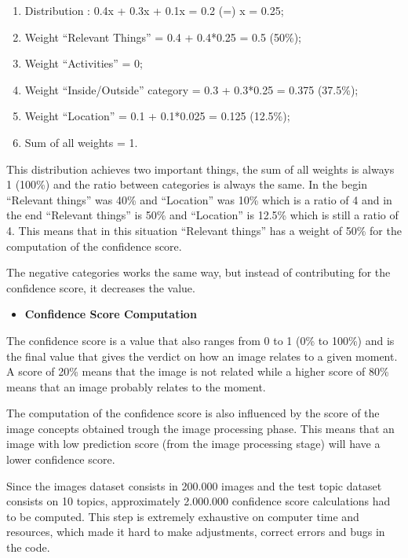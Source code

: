    \begin{enumerate}
    \item Distribution : 0.4x + 0.3x + 0.1x = 0.2 (=) x = 0.25;
    \item Weight \enquote{Relevant Things} = 0.4 + 0.4*0.25 = 0.5 (50\%);
    \item Weight \enquote{Activities} = 0;
    \item Weight \enquote{Inside/Outside} category = 0.3 + 0.3*0.25 = 0.375 (37.5\%);
    \item Weight \enquote{Location} =  0.1 + 0.1*0.025 = 0.125 (12.5\%);
    \item Sum of all weights = 1.
   \end{enumerate}


   This distribution achieves two important things, the sum of all weights is always 1 (100\%) and the ratio between categories is always the same. In the begin \enquote{Relevant things} was 40\% and \enquote{Location} was 10\%  which is a ratio of 4 and in the end \enquote{Relevant things} is 50\% and \enquote{Location} is 12.5\% which is still a ratio of 4. This means that in this situation \enquote{Relevant things} has a weight of 50\% for the computation of the confidence score.
   
   The negative categories works the same way, but instead of contributing for the confidence score, it decreases the value.

    

    \begin{itemize}
      \item \textbf{Confidence Score Computation}
    \end{itemize}

    The confidence score is a value that also ranges from 0 to 1 (0\% to 100\%) and is the final value that gives the verdict on how an image relates to a given moment. A score of 20\% means that the image is not related while a higher score of 80\% means that an image probably relates to the moment. 

    The computation of the confidence score is also influenced by the score of the image concepts obtained trough the image processing phase. This means that an image with low prediction score (from the image processing stage) will have a lower confidence score. 

    Since the images dataset consists in 200.000 images and the test topic dataset consists on 10 topics, approximately 2.000.000 confidence score calculations had to be computed. This step is extremely exhaustive on computer time and resources, which made it hard to make adjustments, correct errors and bugs in the code.
        
